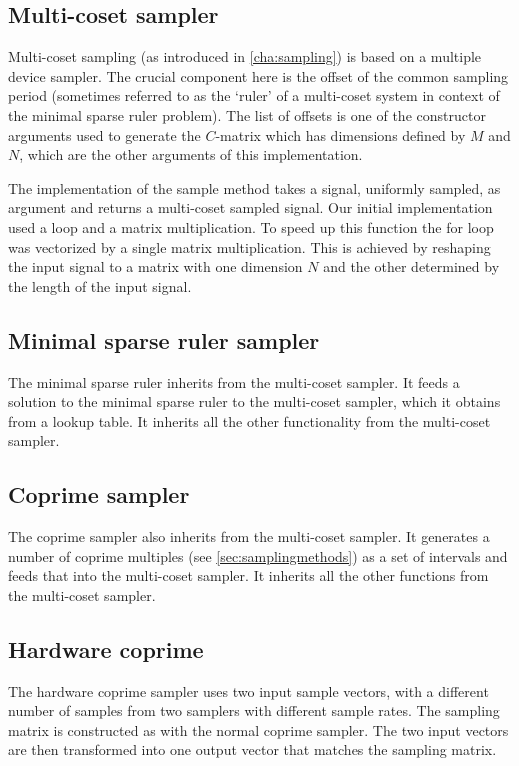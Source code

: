 \documentclass[a4paper, openany, oneside]{memoir}
\begin{document}
\subsection{Multi-coset sampler}
\label{sub:multi_coset_sampler}
Multi-coset sampling (as introduced in \cref{cha:sampling}) is based on a multiple device sampler. The crucial component here is the offset of the common sampling period (sometimes referred to as the `ruler' of a multi-coset system in context of the minimal sparse ruler problem). The list of offsets is one of the constructor arguments used to generate the $C$-matrix which has dimensions defined by $M$ and $N$, which are the other arguments of this implementation.

The implementation of the sample method takes a signal, uniformly sampled, as argument and returns a multi-coset sampled signal. Our initial implementation used a loop and a matrix multiplication. To speed up this function the for loop was vectorized by a single matrix multiplication. This is achieved by reshaping the input signal to a matrix with one dimension $N$ and the other determined by the length of the input signal.

\subsection{Minimal sparse ruler sampler}
\label{sec:multi-coset-sampler}
The minimal sparse ruler inherits from the multi-coset sampler. It feeds a solution to the minimal sparse ruler to the multi-coset sampler, which it obtains from a lookup table. It inherits all the other functionality from the multi-coset sampler.

\subsection{Coprime sampler}
\label{sec:coprime-sampler}
The coprime sampler also inherits from the multi-coset sampler. It generates a number of coprime multiples (see \cref{sec:samplingmethods}) as a set of intervals and feeds that into the multi-coset sampler. It inherits all the other functions from the multi-coset sampler.

\subsection{Hardware coprime}
\label{sec:hardware-coprime}
The hardware coprime sampler uses two input sample vectors, with a different number of samples from two samplers with different sample rates. The sampling matrix is constructed as with the normal coprime sampler. The two input vectors are then transformed into one output vector that matches the sampling matrix.
\end{document}
